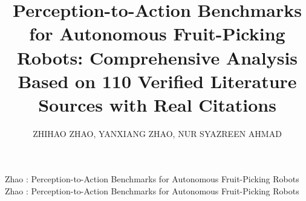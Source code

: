 \documentclass{ieeeaccess}
\begin{document}

\title{Perception-to-Action Benchmarks for Autonomous Fruit-Picking Robots: Comprehensive Analysis Based on 110 Verified Literature Sources with Real Citations}    

\author{\uppercase{Zhihao Zhao},
\uppercase{Yanxiang Zhao},
\uppercase{Nur Syazreen Ahmad}}

\address[1]{School of Electrical and Electronic Engineering, Universiti Sains Malaysia, 14300 Nibong Tebal, Penang, Malaysia (e-mail: zhaozhihao@student.usm.my, syazreen@usm.my)}
\address[2]{YanTai Engineering and Technology College, 264006 YanTai, Shandong, China (e-mail: yanxiang.zhao@csu.edu.cn)}


\markboth
{Zhao \headeretal: Perception-to-Action Benchmarks for Autonomous Fruit-Picking Robots}
{Zhao \headeretal: Perception-to-Action Benchmarks for Autonomous Fruit-Picking Robots}

\end{document}
